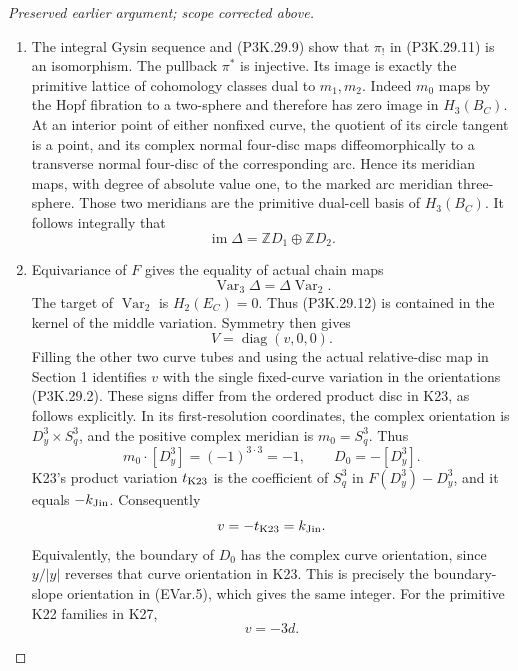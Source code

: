 \begin{proof}[Preserved earlier argument; scope corrected above]
\begin{enumerate}[label=\arabic*.]
\item The integral Gysin sequence and (P3K.29.9) show that
\(\pi_!\) in (P3K.29.11) is an isomorphism. The pullback
\(\pi^*\) is injective. Its image is exactly the primitive
lattice of cohomology classes dual to \(m_1,m_2\).
Indeed \(m_0\) maps by the Hopf fibration to a two-sphere
and therefore has zero image in \(H_3(B_C)\). At an
interior point of either nonfixed curve, the quotient of
its circle tangent is a point, and its complex normal
four-disc maps diffeomorphically to a transverse normal
four-disc of the corresponding arc. Hence its meridian
maps, with degree of absolute value one, to the marked
arc meridian three-sphere. Those two meridians are the
primitive dual-cell basis of \(H_3(B_C)\). It follows
integrally that
\[
                       \operatorname{im}\Delta
                              =\mathbb ZD_1\oplus\mathbb ZD_2.
                                                        \tag{P3K.29.12}
\]

\item Equivariance of \(F\) gives the equality of actual chain
maps
\[
             \operatorname{Var}_3\Delta
                         =\Delta\operatorname{Var}_2.
                                                        \tag{P3K.29.13}
\]
The target of \(\operatorname{Var}_2\) is \(H_2(E_C)=0\).
Thus (P3K.29.12) is contained in the kernel of the middle
variation. Symmetry then gives
\[
                       V=\operatorname{diag}(v,0,0).
                                                        \tag{P3K.29.14}
\]
Filling the other two curve tubes and using the actual
relative-disc map in Section 1 identifies \(v\) with the
single fixed-curve variation in the orientations
(P3K.29.2). These signs differ from the ordered product
disc in K23, as follows explicitly. In its first-resolution
coordinates, the complex orientation is
\(D^3_y\times S^3_q\), and the positive complex meridian
is \(m_0=S^3_q\). Thus
\[
      m_0\cdot[D^3_y]=(-1)^{3\cdot3}=-1,\qquad
      D_0=-[D^3_y].
\]
K23's product variation \(t_{\rm K23}\) is the coefficient
of \(S^3_q\) in \(F(D^3_y)-D^3_y\), and it equals
\(-k_{\rm Jin}\). Consequently
\[
                v=-t_{\rm K23}=k_{\rm Jin}.
\]
Equivalently, the boundary of \(D_0\) has the complex
curve orientation, since \(y/|y|\) reverses that curve
orientation in K23. This is precisely the boundary-slope
orientation in (EVar.5), which gives the same integer.
For the primitive K22 families in K27,
\[
                              v=-3d.
                                                        \tag{P3K.29.15}
\]


\end{enumerate}
\end{proof}
